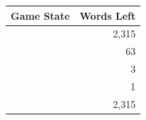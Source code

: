 \documentclass[twocolumn]{tudelft-aiaa}
\begin{document}
\begin{table}[h!]
\begin{centering}
\begin{tabular}{l r}
\bf{Game State} & \bf{Words Left}\\
\hline
\noindent \vspace{1 mm} \texttt{\textcolor{white}{\textbf{\colorbox{g}{S}\hspace{1 mm}\colorbox{k}{O}\hspace{1 mm}\colorbox{k}{A}\hspace{1 mm}\colorbox{k}{R}\hspace{1 mm}\colorbox{k}{E}\hspace{1 mm}}}} & 2,315\\
\noindent \vspace{1 mm} \texttt{\textcolor{white}{\textbf{\colorbox{k}{F}\hspace{1 mm}\colorbox{y}{L}\hspace{1 mm}\colorbox{g}{I}\hspace{1 mm}\colorbox{k}{N}\hspace{1 mm}\colorbox{k}{T}\hspace{1 mm}}}} & 63\\
\noindent \vspace{1 mm} \texttt{\textcolor{white}{\textbf{\colorbox{k}{A}\hspace{1 mm}\colorbox{k}{P}\hspace{1 mm}\colorbox{k}{E}\hspace{1 mm}\colorbox{k}{A}\hspace{1 mm}\colorbox{y}{K}\hspace{1 mm}}}} & 3\\
\noindent \vspace{1 mm} \texttt{\textcolor{white}{\textbf{\colorbox{g}{S}\hspace{1 mm}\colorbox{g}{K}\hspace{1 mm}\colorbox{g}{I}\hspace{1 mm}\colorbox{g}{L}\hspace{1 mm}\colorbox{g}{L}\hspace{1 mm}}}} & 1\\
\hline
\noindent \vspace{1 mm} \texttt{\textcolor{white}{\textbf{\colorbox{k}{S}\hspace{1 mm}\colorbox{y}{O}\hspace{1 mm}\colorbox{y}{A}\hspace{1 mm}\colorbox{k}{R}\hspace{1 mm}\colorbox{k}{E}\hspace{1 mm}}}} & 2,315\\

\end{tabular}
\end{centering}
\end{table}
\end{document}
